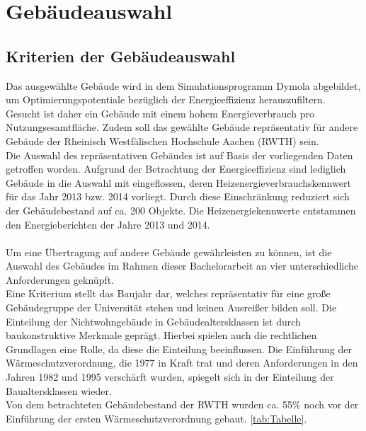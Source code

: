 \chapter{Gebäudeauswahl}
\label{cha:Gebäudeauswahl}
\section{Kriterien der Gebäudeauswahl}
\label{sec:Kriterien der Gebäudeauswahl}


Das ausgewählte Gebäude wird in dem Simulationsprogramm Dymola abgebildet, um Optimierungspotentiale bezüglich der Energieeffizienz herauszufiltern. Gesucht ist daher ein Gebäude mit einem hohem Energieverbrauch pro Nutzungsesamtfläche. Zudem soll das gewählte Gebäude repräsentativ für andere Gebäude der Rheinisch Westfälischen Hochschule Aachen (RWTH) sein.\\
Die Auswahl des repräsentativen Gebäudes ist auf Basis der vorliegenden Daten getroffen worden. Aufgrund der Betrachtung der Energieeffizienz sind lediglich Gebäude in die Auswahl mit eingeflossen, deren Heizenergieverbrauchskennwert für das Jahr 2013 bzw. 2014 vorliegt. Durch diese Einschränkung reduziert sich der Gebäudebestand auf ca. 200 Objekte. Die Heizenergiekennwerte entstammen den Energieberichten der Jahre 2013 und 2014.\\
\\
Um eine Übertragung auf andere Gebäude gewährleisten zu können, ist die Auswahl des Gebäudes im Rahmen dieser Bachelorarbeit an vier unterschiedliche Anforderungen geknüpft. \\
Eine Kriterium stellt das Baujahr dar, welches repräsentativ für eine große Gebäudegruppe der Universität stehen und keinen Ausreißer bilden soll. Die Einteilung der Nichtwohngebäude in Gebäudealtersklassen ist durch baukonstruktive Merkmale geprägt.
Hierbei spielen auch die rechtlichen Grundlagen eine Rolle, da diese die Einteilung beeinflussen. Die Einführung der Wärmeschutzverordnung, die 1977 in Kraft trat und deren Anforderungen in den Jahren 1982 und 1995 verschärft wurden, spiegelt sich in der Einteilung der Baualtersklassen wieder.\\
Von dem betrachteten Gebäudebestand der RWTH wurden ca. 55\% noch vor der Einführung der ersten Wärmeschutzverordnung gebaut. 
 \ref{tab:Tabelle}. 

